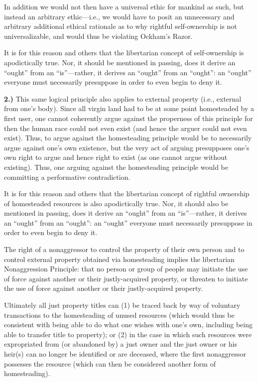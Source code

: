 \documentclass[letterpaper,12pt]{article}
\makeatletter
\newcommand{\asterism}{\smash{%
  \raisebox{-.5ex}{%
    \setlength{\tabcolsep}{-.5pt}%
    \begin{tabular}{@{}cc@{}}%
      \multicolumn2c*\\[-2ex]*&*%
    \end{tabular}}}}
\makeatother
\begin{document}
In addition we would not then have a universal ethic for mankind as such, but instead an arbitrary ethic---i.e., we would have to posit an unnecessary and arbitrary additional ethical rationale as to why rightful self-ownership is not universalizable, and would thus be violating Ockham's Razor.

It is for this reason and others that the libertarian concept of self-ownership is apodictically true. Nor, it should be mentioned in passing, does it derive an ``ought'' from an ``is''---rather, it derives an ``ought'' from an ``ought'': an ``ought'' everyone must necessarily presuppose in order to even begin to deny it.

\textbf{2.)} This same logical principle also applies to external property (i.e., external from one's body). Since all virgin land had to be at some point homesteaded by a first user, one cannot coherently argue against the properness of this principle for then the human race could not even exist (and hence the arguer could not even exist). Thus, to argue against the homesteading principle would be to necessarily argue against one's own existence, but the very act of arguing presupposes one's own right to argue and hence right to exist (as one cannot argue without existing). Thus, one arguing against the homesteading principle would be committing a performative contradiction.

It is for this reason and others that the libertarian concept of rightful ownership of homesteaded resources is also apodictically true. Nor, it should also be mentioned in passing, does it derive an ``ought'' from an ``is''---rather, it derives an ``ought'' from an ``ought'': an ``ought'' everyone must necessarily presuppose in order to even begin to deny it.

\vspace{1em}
\centerline{\asterism}
\vspace{1em}

The right of a nonaggressor to control the property of their own person and to control external property obtained via homesteading implies the libertarian Nonaggression Principle: that no person or group of people may initiate the use of force against another or their justly-acquired property, or threaten to initiate the use of force against another or their justly-acquired property.

Ultimately all just property titles can (1) be traced back by way of voluntary transactions to the homesteading of unused resources (which would thus be consistent with being able to do what one wishes with one's own, including being able to transfer title to property); or (2) in the case in which such resources were expropriated from (or abandoned by) a just owner and the just owner or his heir(s) can no longer be identified or are deceased, where the first nonaggressor possesses the resource (which can then be considered another form of homesteading).
\end{document}
